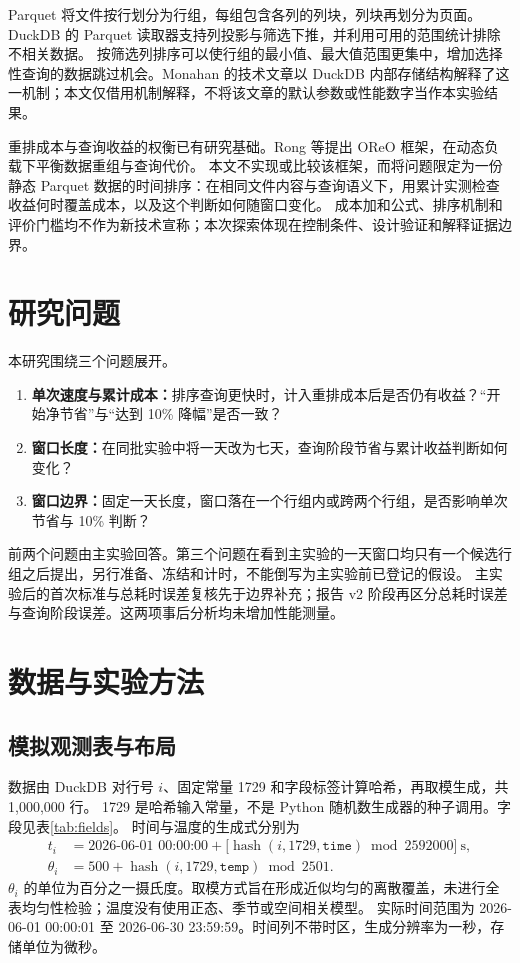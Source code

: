 \documentclass[UTF8,a4paper,zihao=-4,fontset=none]{ctexart}
\newcommand{\pct}{\%}
\begin{document}
Parquet 将文件按行划分为行组，每组包含各列的列块，列块再划分为页面\cite{parquet}。
DuckDB 的 Parquet 读取器支持列投影与筛选下推，并利用可用的范围统计排除不相关数据\cite{duckdb}。
按筛选列排序可以使行组的最小值、最大值范围更集中，增加选择性查询的数据跳过机会。Monahan 的技术文章以 DuckDB 内部存储结构解释了这一机制\cite{monahan}；本文仅借用机制解释，不将该文章的默认参数或性能数字当作本实验结果。

重排成本与查询收益的权衡已有研究基础。Rong 等提出 OReO 框架，在动态负载下平衡数据重组与查询代价\cite{rong}。
本文不实现或比较该框架，而将问题限定为一份静态 Parquet 数据的时间排序：在相同文件内容与查询语义下，用累计实测检查收益何时覆盖成本，以及这个判断如何随窗口变化。
成本加和公式、排序机制和评价门槛均不作为新技术宣称；本次探索体现在控制条件、设计验证和解释证据边界。

\section{研究问题}
\label{sec:questions}
本研究围绕三个问题展开。
\begin{enumerate}
  \item \textbf{单次速度与累计成本：}排序查询更快时，计入重排成本后是否仍有收益？“开始净节省”与“达到 10\pct{} 降幅”是否一致？
  \item \textbf{窗口长度：}在同批实验中将一天改为七天，查询阶段节省与累计收益判断如何变化？
  \item \textbf{窗口边界：}固定一天长度，窗口落在一个行组内或跨两个行组，是否影响单次节省与 10\pct{} 判断？
\end{enumerate}
前两个问题由主实验回答。第三个问题在看到主实验的一天窗口均只有一个候选行组之后提出，另行准备、冻结和计时，不能倒写为主实验前已登记的假设。
主实验后的首次标准与总耗时误差复核先于边界补充；报告 v2 阶段再区分总耗时误差与查询阶段误差。这两项事后分析均未增加性能测量。

\section{数据与实验方法}
\label{sec:methods}
\subsection{模拟观测表与布局}
数据由 DuckDB 对行号 $i$、固定常量 1729 和字段标签计算哈希，再取模生成，共 1,000,000 行。
1729 是哈希输入常量，不是 Python 随机数生成器的种子调用。字段见表\ref{tab:fields}。
时间与温度的生成式分别为
\begin{align}
t_i &= \text{2026-06-01 00:00:00}
       +\bigl[\operatorname{hash}(i,1729,\texttt{time})\bmod2592000\bigr]\ \mathrm{s},\label{eq:time}\\
\theta_i &= 500+\operatorname{hash}(i,1729,\texttt{temp})\bmod2501.\label{eq:temp}
\end{align}
$\theta_i$ 的单位为百分之一摄氏度。取模方式旨在形成近似均匀的离散覆盖，未进行全表均匀性检验；温度没有使用正态、季节或空间相关模型。
实际时间范围为 2026-06-01 00:00:01 至 2026-06-30 23:59:59。时间列不带时区，生成分辨率为一秒，存储单位为微秒。
\end{document}
